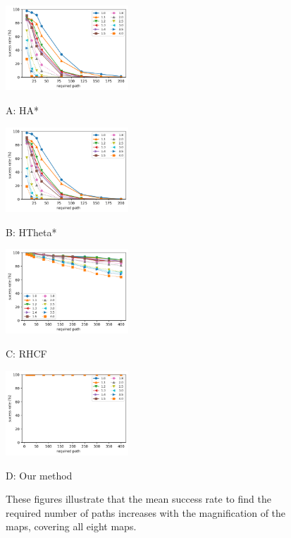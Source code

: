 \documentclass[letterpaper, 10 pt, journal, twoside]{IEEEtran}
\begin{document}
\begin{figure}[t] \scriptsize
\begin{minipage}{.245\linewidth}
  \centerline{\includegraphics[width=4.6cm]{HsAs_scale_succ_method_path_count.png}}
  \centerline{A: HA*}
\end{minipage}
\hfill
\begin{minipage}{.245\linewidth}
  \centerline{\includegraphics[width=4.6cm]{HsTs_scale_succ_method_path_count.png}}
  \centerline{B: HTheta*}
\end{minipage}
\hfill
\begin{minipage}{.245\linewidth}
  \centerline{\includegraphics[width=4.6cm]{RHCF_scale_succ_method_path_count.png}}
  \centerline{C: RHCF}
\end{minipage}
\hfill
\begin{minipage}{.245\linewidth}
  \centerline{\includegraphics[width=4.6cm]{RJ_scale_succ_method_path_count.png}}
  \centerline{D: Our method}
\end{minipage}
\vfill

\caption{These figures illustrate that the mean success rate to find the required number of paths increases with the magnification of the maps, covering all eight maps.}
\label{scale_succ_method_path_count}
\end{figure}
\end{document}
